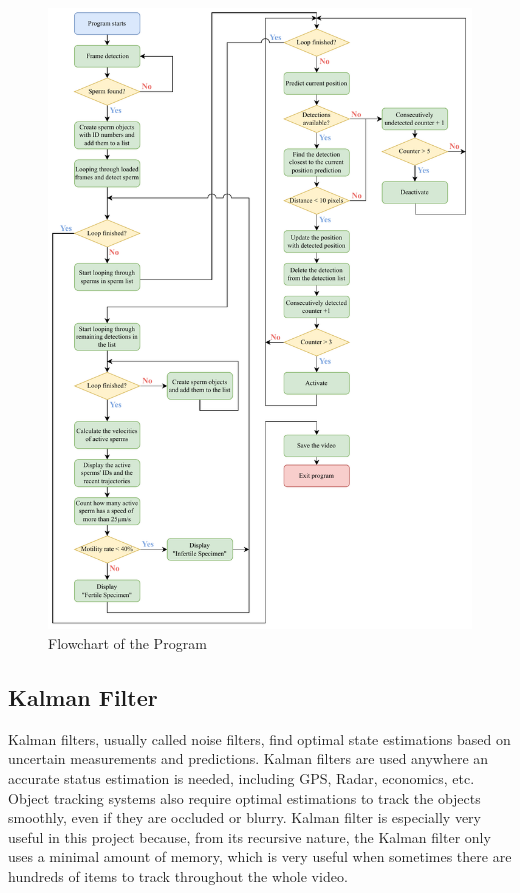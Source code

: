 \clearpage
\begin{figure}[ht!]
\centering
\includegraphics[width=13cm]{Images/flowchart.drawio.pdf}
\caption{Flowchart of the Program}
\label{flowchart}
\end{figure}


\subsection{Kalman Filter} \label{kalman}
Kalman filters, usually called noise filters, find optimal state estimations based on uncertain measurements and predictions. \cite{kalman}\cite{kalman2} Kalman filters are used anywhere an accurate status estimation is needed, including GPS, Radar, economics, etc. Object tracking systems also require optimal estimations to track the objects smoothly, even if they are occluded or blurry. Kalman filter is especially very useful in this project because, from its recursive nature, the Kalman filter only uses a minimal amount of memory, which is very useful when sometimes there are hundreds of items to track throughout the whole video. 

